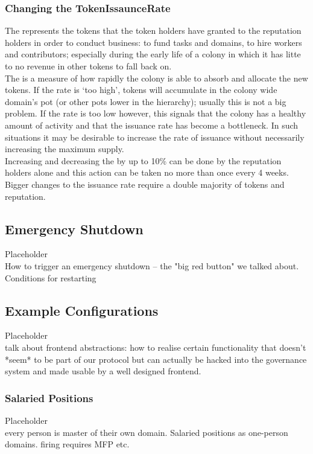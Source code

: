\subsubsection{Changing the TokenIssaunceRate}
The  represents the tokens that the token holders have granted to the reputation holders in order to conduct business: to fund tasks and domains, to hire workers and contributors; especially during the early life of a colony in which it has litte to no revenue in other tokens to fall back on.\\
The  is a measure of how rapidly the colony is able to absorb and allocate the new tokens. If the rate is `too high', tokens will accumulate in the colony wide domain's pot (or other pots lower in the hierarchy); usually this is not a big problem. If the rate is too low however, this signals that the colony has a healthy amount of activity and that the issuance rate has become a bottleneck. In such situations it may be desirable to increase the rate of issuance without necessarily increasing the maximum supply. \\
Increasing and decreasing the  by up to 10\% can be done by the reputation holders alone and this action can be taken no more than once every 4 weeks. Bigger changes to the issuance rate require a double majority of tokens and reputation.

\subsection{Emergency Shutdown}
%
Placeholder\\
How to trigger an emergency shutdown -- the "big red button" we talked about.
Conditions for restarting
%

\subsection{Example Configurations}\label{sec:example-configs}
%
Placeholder\\
talk about frontend abstractions: how to realise certain functionality that doesn't *seem* to be part of our protocol but can actually be hacked into the governance system and made usable by a well designed frontend.
%

\subsubsection{Salaried Positions}\label{sec:salary}
%
Placeholder\\
every person is master of their own domain. 
Salaried positions as one-person domains.
firing requires MFP etc.
%



